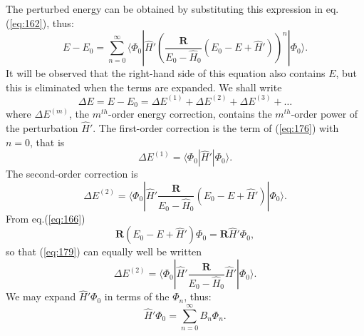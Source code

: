 The perturbed energy can be obtained by substituting this expression in eq.(\ref{eq:162}), thus:
\begin{equation}
\label{eq:176}
E-E_0 = \sum_{n=0}^{\infty} \big\langle   \Phi_0  | \hat{H}' \left(  \frac{\mathbf{R}}{E_0 - \hat{H}_0} (E_0 - E +\hat{H}') \right)^n   |   \Phi_0 \big\rangle.
\end{equation}
It will be observed that the right-hand side of this equation also contains $E$, but this is eliminated when the terms are expanded.
We shall write
\begin{equation}
\nonumber
\Delta E = E -E_0 = \Delta E^{(1)} + \Delta E^{(2)} +\Delta E^{(3)} + \dots
\end{equation}
where $\Delta E^{(m)}$, the $m^{th}$-order energy correction, contains the $m^{th}$-order power of the perturbation $\hat{H}'$. The first-order correction is the term of (\ref{eq:176}) with $n=0$, that is
\begin{equation}
\nonumber
\Delta E^{(1)} = \langle   \Phi_0  | \hat{H}' | \Phi_0 \rangle.
\end{equation}
The second-order correction is
\begin{equation}
\label{eq:179}
\Delta E^{(2)} = \langle   \Phi_0  | \hat{H}'  \frac{\mathbf{R}}{E_0 - \hat{H}_0} (E_0 - E +\hat{H}')   |   \Phi_0 \rangle.
\end{equation}
From eq.(\ref{eq:166}) 
\begin{equation}
\nonumber
\mathbf{R} (E_0 - E +\hat{H}') \Phi_0 = \mathbf{R} \hat{H}' \Phi_0,
\end{equation}
so that (\ref{eq:179}) can equally well be written
\begin{equation}
\label{eq:181}
\Delta E^{(2)} = \langle   \Phi_0  | \hat{H}'  \frac{\mathbf{R}}{E_0 - \hat{H}_0} \hat{H}'   |   \Phi_0 \rangle.
\end{equation}
We may expand $\hat{H}' \Phi_0$ in terms of the $\Phi_n$, thus:
\begin{equation}
\nonumber
 \hat{H}'  \Phi_0 = \sum_{n=0}^{\infty} B_n \Phi_n.
\end{equation}

